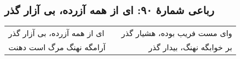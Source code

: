 \begin{center}
\section*{رباعی شمارهٔ ۹۰: ای از همه آزرده، بی آزار گذر}
\label{sec:090}
\begin{longtable}{l p{0.5cm} r}
ای از همه آزرده، بی آزار گذر
&&
وای مست فریب بوده، هشیار گذر
\\
آرامگه نهنگ مرگ است دهنت
&&
بر خوابگه نهنگ، بیدار گذر
\\
\end{longtable}
\end{center}
